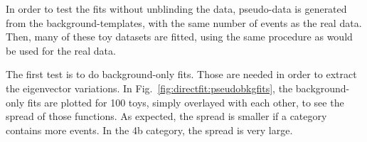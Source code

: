 In order to test the fits without unblinding the data, pseudo-data is generated from the background-templates, with the same number of events as the real data. Then, many of these toy datasets are fitted, using the same procedure as would be used for the real data.

The first test is to do background-only fits. Those are needed in order to extract the eigenvector variations. In Fig.~\ref{fig:directfit:pseudobkgfits}, the background-only fits are plotted for 100 toys, simply overlayed with each other, to see the spread of those functions. As expected, the spread is smaller if a category contains more events. In the 4b category, the spread is very large.

\begin{figure}[htbp!]
\begin{center}
 \\

\end{center}
\end{figure}

